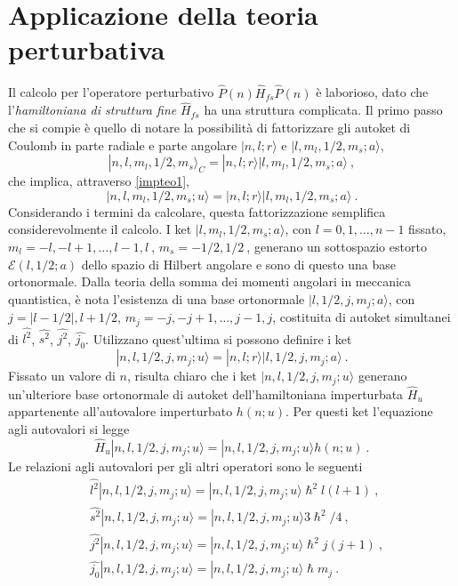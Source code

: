 \documentclass[12pt,a4paper]{report}
\numberwithin{equation}{section}
\numberwithin{section}{chapter}
\begin{document}
	\section{Applicazione della teoria perturbativa}\label{sec:appteo}
	Il calcolo per l'operatore perturbativo $\widehat{P}(n)\widehat{H}_{fs}\widehat{P}(n)$ \`e laborioso, dato che l'\textit{hamiltoniana di struttura fine} $\widehat{H}_{fs}$ ha una struttura complicata. Il primo passo che si compie \`e quello di notare la possibilit\`a di fattorizzare gli autoket di Coulomb in parte radiale e  parte angolare $|n,l;r\rangle$ e $|l,m_l,1/2,m_s;a\rangle$,
	\begin{equation}
	\label{appteo1}
	|n,l,m_l,1/2,m_s\rangle_C = |n,l;r\rangle|l,m_l,1/2,m_s;a\rangle~,
	\end{equation}
	che implica, attraverso \eqref{impteo1},
	\begin{equation}
	\label{appteo2}
	|n,l,m_l,1/2,m_s;u\rangle = |n,l;r\rangle|l,m_l,1/2,m_s;a\rangle~.
	\end{equation}
	Considerando i termini da calcolare, questa fattorizzazione semplifica considerevolmente il calcolo. I ket $|l,m_l,1/2,m_s;a\rangle$, con $l=0,1,\dots, n-1$ fissato, $m_l=-l,-l+1,\dots,l-1,l~$, $m_s=-1/2,1/2~$, generano un sottospazio estorto $\mathcal{E}(l,1/2;a)$ dello spazio di Hilbert angolare e sono di questo una base ortonormale. Dalla teoria della somma dei momenti angolari in meccanica quantistica, \`e nota l'esistenza di una base ortonormale $|l,1/2,j,m_j;a\rangle$, con $j = |l-1/2|,l+1/2$, $m_j = -j,-j+1,\dots,j-1,j$, costituita di autoket simultanei di $\widehat{l^2}$, $\widehat{s^2}$, $\widehat{j^2}$, $\widehat{j_0}$. Utilizzano quest'ultima si possono definire i ket
	\begin{equation}
	\label{appteo3}
	|n,l,1/2,j,m_j;u\rangle=|n,l;r\rangle|l,1/2,j,m_j;a\rangle~.
	\end{equation}
	Fissato un valore di $n$, risulta chiaro che i ket $|n,l,1/2,j,m_j;u\rangle$ generano un'ulteriore base ortonormale di autoket dell'hamiltoniana imperturbata $\widehat{H}_u$ appartenente all'autovalore imperturbato $h(n;u)$. Per questi ket l'equazione agli autovalori si legge
	\begin{equation}
	\label{appteo4}
	\widehat{H}_u|n,l,1/2,j,m_j;u\rangle=|n,l,1/2,j,m_j;u\rangle h(n;u)~.
	\end{equation}
	Le relazioni agli autovalori per gli altri operatori sono le seguenti
	\begin{subequations}
		\begin{align}
		&\widehat{l^2}|n,l,1/2,j,m_j;u\rangle=|n,l,1/2,j,m_j;u\rangle\hslash^2l(l+1)~,\label{appteo5:first}\\
		&\widehat{s^2}|n,l,1/2,j,m_j;u\rangle=|n,l,1/2,j,m_j;u\rangle3\hslash^2/4~,\label{appteo5:second}\\
		&\widehat{j^2}|n,l,1/2,j,m_j;u\rangle=|n,l,1/2,j,m_j;u\rangle\hslash^2j(j+1)~,\label{appteo5:third}\\
		&\widehat{j_0}|n,l,1/2,j,m_j;u\rangle=|n,l,1/2,j,m_j;u\rangle\hslash m_j~.\label{appteo5:fourth}
		\end{align}
	\end{subequations}
\end{document}
